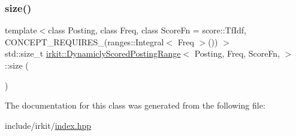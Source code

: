 \subsubsection{\texorpdfstring{size()}{size()}}
{\footnotesize\ttfamily template$<$class Posting, class Freq, class Score\+Fn = score\+::\+Tf\+Idf, C\+O\+N\+C\+E\+P\+T\+\_\+\+R\+E\+Q\+U\+I\+R\+E\+S\+\_\+(ranges\+::\+Integral$<$ Freq $>$()) $>$ \\
std\+::size\+\_\+t \hyperlink{classirkit_1_1DynamiclyScoredPostingRange}{irkit\+::\+Dynamicly\+Scored\+Posting\+Range}$<$ Posting, Freq, Score\+Fn, $>$\+::size (\begin{DoxyParamCaption}{ }\end{DoxyParamCaption})\hspace{0.3cm}{\ttfamily [inline]}}



The documentation for this class was generated from the following file\+:\begin{DoxyCompactItemize}
\item 
include/irkit/\hyperlink{irkit_2index_8hpp}{index.\+hpp}\end{DoxyCompactItemize}
